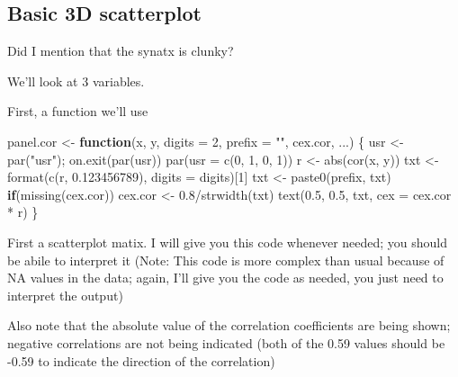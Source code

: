 \documentclass[
]{book}
\newenvironment{Shaded}{\begin{snugshade}}{\end{snugshade}}
\newcommand{\AttributeTok}[1]{\textcolor[rgb]{0.77,0.63,0.00}{#1}}
\newcommand{\ControlFlowTok}[1]{\textcolor[rgb]{0.13,0.29,0.53}{\textbf{#1}}}
\newcommand{\DecValTok}[1]{\textcolor[rgb]{0.00,0.00,0.81}{#1}}
\newcommand{\FloatTok}[1]{\textcolor[rgb]{0.00,0.00,0.81}{#1}}
\newcommand{\FunctionTok}[1]{\textcolor[rgb]{0.00,0.00,0.00}{#1}}
\newcommand{\NormalTok}[1]{#1}
\newcommand{\OtherTok}[1]{\textcolor[rgb]{0.56,0.35,0.01}{#1}}
\newcommand{\SpecialCharTok}[1]{\textcolor[rgb]{0.00,0.00,0.00}{#1}}
\newcommand{\StringTok}[1]{\textcolor[rgb]{0.31,0.60,0.02}{#1}}
\begin{document}
\hypertarget{basic-3d-scatterplot}{%
\subsection{Basic 3D scatterplot}\label{basic-3d-scatterplot}}

Did I mention that the synatx is clunky?

We'll look at 3 variables.

First, a function we'll use

\begin{Shaded}
\begin{Highlighting}[]
\NormalTok{panel.cor }\OtherTok{\textless{}{-}} \ControlFlowTok{function}\NormalTok{(x, y, }\AttributeTok{digits =} \DecValTok{2}\NormalTok{, }\AttributeTok{prefix =} \StringTok{""}\NormalTok{, cex.cor, ...)}
\NormalTok{\{}
\NormalTok{    usr }\OtherTok{\textless{}{-}} \FunctionTok{par}\NormalTok{(}\StringTok{"usr"}\NormalTok{); }\FunctionTok{on.exit}\NormalTok{(}\FunctionTok{par}\NormalTok{(usr))}
    \FunctionTok{par}\NormalTok{(}\AttributeTok{usr =} \FunctionTok{c}\NormalTok{(}\DecValTok{0}\NormalTok{, }\DecValTok{1}\NormalTok{, }\DecValTok{0}\NormalTok{, }\DecValTok{1}\NormalTok{))}
\NormalTok{    r }\OtherTok{\textless{}{-}} \FunctionTok{abs}\NormalTok{(}\FunctionTok{cor}\NormalTok{(x, y))}
\NormalTok{    txt }\OtherTok{\textless{}{-}} \FunctionTok{format}\NormalTok{(}\FunctionTok{c}\NormalTok{(r, }\FloatTok{0.123456789}\NormalTok{), }\AttributeTok{digits =}\NormalTok{ digits)[}\DecValTok{1}\NormalTok{]}
\NormalTok{    txt }\OtherTok{\textless{}{-}} \FunctionTok{paste0}\NormalTok{(prefix, txt)}
    \ControlFlowTok{if}\NormalTok{(}\FunctionTok{missing}\NormalTok{(cex.cor)) cex.cor }\OtherTok{\textless{}{-}} \FloatTok{0.8}\SpecialCharTok{/}\FunctionTok{strwidth}\NormalTok{(txt)}
    \FunctionTok{text}\NormalTok{(}\FloatTok{0.5}\NormalTok{, }\FloatTok{0.5}\NormalTok{, txt, }\AttributeTok{cex =}\NormalTok{ cex.cor }\SpecialCharTok{*}\NormalTok{ r)}
\NormalTok{\}}
\end{Highlighting}
\end{Shaded}

First a scatterplot matix. I will give you this code whenever needed; you should be abile to interpret it (Note: This code is more complex than usual because of NA values in the data; again, I'll give you the code as needed, you just need to interpret the output)

Also note that the absolute value of the correlation coefficients are being shown; negative correlations are not being indicated (both of the 0.59 values should be -0.59 to indicate the direction of the correlation)
\end{document}
